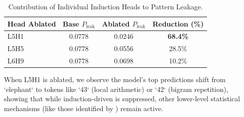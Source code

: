 \begin{table}[h]
\centering
\caption{Contribution of Individual Induction Heads to Pattern Leakage.}
\begin{tabular}{@{}lccc@{}}
\toprule
\textbf{Head Ablated} & \textbf{Base $P_{\text{leak}}$} & \textbf{Ablated $P_{\text{leak}}$} & \textbf{Reduction (\%)} \\
\midrule
L5H1 & 0.0778 & 0.0246 & \textbf{68.4\%} \\
L5H5 & 0.0778 & 0.0556 & 28.5\% \\
L6H9 & 0.0778 & 0.0698 & 10.2\% \\
\bottomrule
\end{tabular}
\label{tab:single_head}
\end{table}

When L5H1 is ablated, we observe the model's top predictions shift from `elephant` to tokens like `43` (local arithmetic) or `42` (bigram repetition), showing that while induction-driven \leakage is suppressed, other lower-level statistical mechanisms (like those identified by \citet{edelman2024evolution}) remain active.
